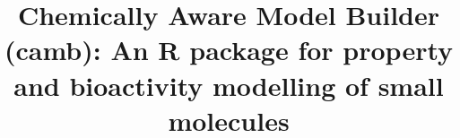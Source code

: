 \documentclass{bmcart}
\begin{document}
\begin{frontmatter}

\begin{fmbox}


\title{Chemically Aware Model Builder (camb): An R package for property and bioactivity modelling of small molecules}


\author[
   addressref={cambridge},                  
   noteref={n1},                        
]{ }	
\author[
   addressref={paris},
   noteref={n1}, 
]{ }
\author[
   addressref={ebi},
]{ }
\author[
   addressref={unilever},
]{ }
\author[
   addressref={cambridge},
]{ }
\author[
   addressref={paris},
]{ }
\author[
   addressref={cambridge},
   email={rcg28@cam.ac.uk},
]{ }


\address[id=cambridge]{
  , 
  ,                     
  ,                         
  ,                             
}


\end{fmbox}
\end{frontmatter}
\end{document}
